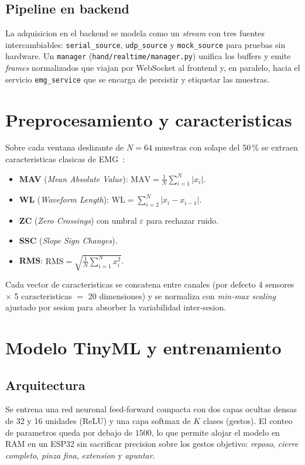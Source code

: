 \documentclass[11pt,a4paper]{article}
\begin{document}
\subsection{Pipeline en backend}
La adquisicion en el backend se modela como un \emph{stream} con tres
fuentes intercambiables: \texttt{serial\_source},
\texttt{udp\_source} y \texttt{mock\_source} para pruebas sin
hardware. Un \texttt{manager} (\texttt{hand/realtime/manager.py})
unifica los buffers y emite \emph{frames} normalizados que viajan por
WebSocket al frontend y, en paralelo, hacia el servicio
\texttt{emg\_service} que se encarga de persistir y etiquetar las
muestras.

\section{Preprocesamiento y caracteristicas}
\label{sec:features}

Sobre cada ventana deslizante de $N{=}64$ muestras con solape del
50\,\% se extraen caracteristicas clasicas de EMG~\cite{hudgins1993new}:

\begin{itemize}
  \item \textbf{MAV} (\emph{Mean Absolute Value}):
        $\mathrm{MAV}=\frac{1}{N}\sum_{i=1}^{N}|x_i|$.
  \item \textbf{WL} (\emph{Waveform Length}):
        $\mathrm{WL}=\sum_{i=2}^{N}|x_i-x_{i-1}|$.
  \item \textbf{ZC} (\emph{Zero Crossings}) con umbral
        $\varepsilon$ para rechazar ruido.
  \item \textbf{SSC} (\emph{Slope Sign Changes}).
  \item \textbf{RMS}: $\mathrm{RMS}=\sqrt{\frac{1}{N}\sum_{i=1}^{N} x_i^2}$.
\end{itemize}

Cada vector de caracteristicas se concatena entre canales (por defecto
4 sensores $\times$ 5 caracteristicas $=$ 20 dimensiones) y se
normaliza con \emph{min-max scaling} ajustado por sesion para
absorber la variabilidad inter-sesion.

\section{Modelo TinyML y entrenamiento}
\label{sec:model}

\subsection{Arquitectura}
Se entrena una red neuronal feed-forward compacta con dos capas
ocultas densas de 32 y 16 unidades (ReLU) y una capa softmax de
$K$ clases (gestos). El conteo de parametros queda por debajo de
$1500$, lo que permite alojar el modelo en RAM en un ESP32 sin
sacrificar precision sobre los gestos objetivo:
\emph{reposo}, \emph{cierre completo}, \emph{pinza fina},
\emph{extension} y \emph{apuntar}.
\end{document}
